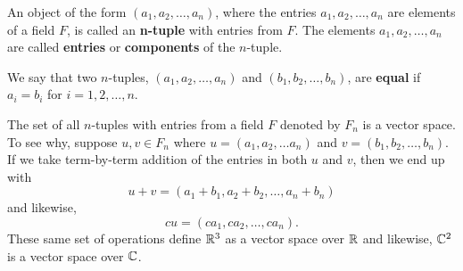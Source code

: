 \begin{definition}{}{}
    An object of the form \( (a_{1}, a_{2}, \dots ,a_{n}) \), where the entries \( a_{1}, a_{2} , \dots, a_{n} \) are elements of a field \( F  \), is called an \textbf{n-tuple} with entries from \( F  \). The elements \( a_{1}, a_{2} , \dots, a_{n} \) are called \textbf{entries} or \textbf{components} of the \( n \)-tuple.
\end{definition}


\begin{definition}{}{}
    We say that two \( n \)-tuples, \( (a_{1}, a_{2}, \dots, a_{n}) \) and \( (b_{1}, b_{2}, \dots , b_{n}) \),  are \textbf{equal} if \( a_{i} = b_{i}  \) for \( i = 1,2, \dots, n \).  
\end{definition}

\begin{eg}{}{}
    The set of all \( n \)-tuples with entries from a field \( F  \) denoted by \( F_{n} \) is a vector space. To see why, suppose \( u, v \in F_{n}  \) where \( u = (a_{1}, a_{2}, \dots a_{n}) \) and \( v = (b_{1}, b_{2}, \dots, b_{n}) \). If we take term-by-term addition of the entries in both \( u  \) and \(  v  \), then we end up with 
    \[  u + v = (a_{1} + b_{1}, a_{2} + b_{2}, \dots , a_{n} + b_{n}) \]
and likewise,
    \[ cu = (ca_{1}, ca_{2}, \dots, ca_{n}).   \]
    These same set of operations define \( \mathbb{R} ^{3} \) as a vector space over \( \mathbb{R}  \) and likewise, \( \mathbb{C} ^{2} \) is a vector space over \( \mathbb{C}  \).


\end{eg}




